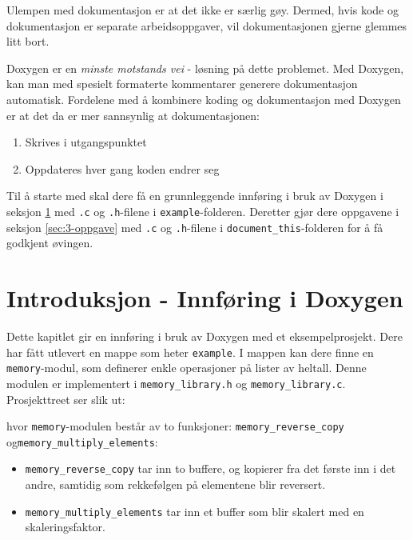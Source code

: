 \begin{alphasection}
Ulempen med dokumentasjon er at det ikke er særlig gøy. Dermed, hvis kode
og dokumentasjon er separate arbeidsoppgaver, vil dokumentasjonen gjerne
glemmes litt bort. 

Doxygen er en \textit{minste motstands vei} - løsning på dette problemet. Med Doxygen, kan man med spesielt formaterte kommentarer generere dokumentasjon automatisk. Fordelene med å kombinere koding og dokumentasjon med Doxygen er at det da er mer sannsynlig at dokumentasjonen:

\begin{enumerate}
    \item Skrives i utgangspunktet
    \item Oppdateres hver gang koden endrer seg
\end{enumerate}

Til å starte med skal dere få en grunnleggende innføring i bruk av Doxygen i seksjon \ref{sec:2-innføring} med \verb|.c| og \verb|.h|-filene i \verb|example|-folderen. Deretter gjør dere oppgavene i seksjon \ref{sec:3-oppgave} med \verb|.c| og \verb|.h|-filene i \verb|document_this|-folderen for å få godkjent øvingen. 



\section{Introduksjon - Innføring i Doxygen}\label{sec:2-innføring}

Dette kapitlet gir en innføring i bruk av Doxygen med et eksempelprosjekt. Dere har fått utlevert en mappe som heter \verb|example|. I mappen kan dere finne en \verb|memory|-modul, som definerer enkle operasjoner på lister av heltall. Denne modulen er implementert i \verb|memory_library.h| og \verb|memory_library.c|. Prosjekttreet ser slik ut:



hvor \verb|memory|-modulen består av to funksjoner: \verb|memory_reverse_copy| og\newline \verb|memory_multiply_elements|:
\begin{itemize}
    \item  \verb|memory_reverse_copy| tar inn to buffere, og kopierer fra det første inn i det andre, samtidig som rekkefølgen på elementene blir reversert. 
    \item \verb|memory_multiply_elements| tar inn et buffer som blir skalert med en skaleringsfaktor.
\end{itemize}



\end{alphasection}
